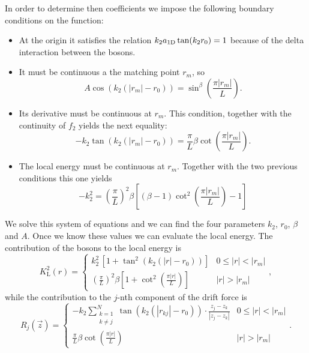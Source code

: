 In order to determine then coefficients we impose the following boundary
conditions on the function:
%
\begin{itemize}
	\item At the origin it satisfies the relation $k_2 a_{ \mathrm{1D} } \tan(k_2 r_0) =
	1$ because of the delta interaction between the bosons.

	\item It must be continuous a the matching point $r_m$, so
	\begin{equation}
		A \cos(k_2(|r_m| - r_0)) = \sin^{\beta}\left(\frac{\pi |r_m|}{L} \right).
	\end{equation}

	\item Its derivative must be continuous at $r_m$. This condition, together
	with the continuity of $f_2$ yields the next equality:
	\begin{equation}
		-k_2 \tan(k_2(|r_m| - r_0)) = \frac{\pi}{L} \beta \cot\left(\frac{\pi |r_m|}{L} \right).
	\end{equation}

	\item The local energy must be continuous at $r_m$. Together with the two
	previous conditions this one yields
	\begin{equation}
		-k_2^2 = \left(\frac{\pi}{L}\right)^2 \beta \left[ (\beta - 1) \cot^2\left(\frac{\pi |r_m|}{L} \right) -1 \right]
	\end{equation}
\end{itemize}
%
We solve this system of equations and we can find the four parameters $k_2$,
$r_0$, $\beta$ and $A$. Once we know these values we can evaluate the local
energy. The contribution of the bosons to the local energy is
%
\begin{equation}
	K_{\mathrm{L}}^2(r) = \begin{cases}
		k_2^2 \, [1 + \tan^2(k_2(|r| - r_0))] & 0 \leq |r| < |r_m| \\
		\left(\frac{\pi}{L}\right)^2 \beta \left[ 1 + \cot^2\left(\frac{\pi |r|}{L} \right) \right] &  |r| > |r_m|
	\end{cases},
\end{equation}
%
while the contribution to the $j$-nth component of the drift force is
%
\begin{equation}
	R_{j}(\vec z) = \begin{cases}
		-k_2 \displaystyle \sum_{\substack{k=1 \\ k \neq j}}^{N} \tan(k_2(|r_{kj}| - r_0)) \cdot \frac{z_j - z_k}{|z_j - z_k|} & 0 \leq |r| < |r_m| \\
		\frac{\pi}{L} \beta \cot \left( \frac{\pi |r|}{L} \right) & |r| > |r_m|
	\end{cases}.
\end{equation}
